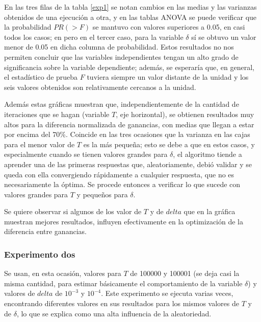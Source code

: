 En las tres filas de la tabla \ref{exp1} se notan cambios en las medias y las varianzas obtenidos de una ejecución a otra, y en las tablas ANOVA se puede verificar que la probabilidad $PR(>F)$ se mantuvo con valores superiores a 0.05, en casi todos los casos; en  pero en el tercer caso, para la variable $\delta$ sí se obtuvo un valor menor de 0.05 en dicha columna de probabilidad. Estos resultados no nos permiten concluir que las variables independientes tengan un alto grado de significancia sobre la variable dependiente; además, se esperaría que, en general, el estadístico de prueba $F$ tuviera siempre un valor distante de la unidad y los seis valores obtenidos son relativamente cercanos a la unidad. 

Además estas gráficas muestran que, independientemente de la cantidad de iteraciones que se hagan (variable $T$, eje horizontal), se obtienen resultados muy altos para la diferencia normalizada de ganancias, con medias que llegan a estar por encima del 70\%. Coincide en las tres ocasiones que la varianza en las cajas para el menor valor de $T$ es la más pequeña; esto se debe a que en estos casos, y especialmente cuando se tienen valores grandes para $\delta$, el algoritmo tiende a aprender una de las primeras respuestas que, aleatoriamente, debió validar y se queda con ella convergiendo rápidamente a cualquier respuesta, que no es necesariamente la óptima. Se procede entonces a verificar lo que sucede con valores grandes para $T$ y pequeños para $\delta$.

Se quiere observar si algunos de los valor de $T$ y de $delta$ que en la gráfica muestran mejores resultados, influyen efectivamente en la optimización de la diferencia entre ganancias.

\subsubsection{Experimento dos}


Se usan, en esta ocasión, valores para $T$ de 100000 y 100001 (se deja casi la misma cantidad, para estimar básicamente el comportamiento de la variable $\delta$) y valores de $delta$ de $10^{-3}$ y $10^{-4}$. Este experimento se ejecuta varias veces, encontrando diferentes valores en sus resultados para los mismos valores de $T$ y de $\delta$, lo que se explica como una alta influencia de la aleatoriedad. 

